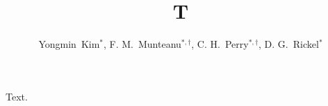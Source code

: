 \documentclass[aps]{revtex4-2}
\begin{document}
\title{T}
\author{Yongmin\, Kim$^*$, F. M.\, Munteanu$^{*,\dag}$, C. H.\, Perry$^{*,\dag}$, D. G.\, Rickel$^*$}
\maketitle
Text.
\end{document}

